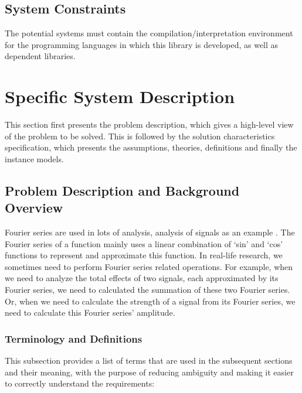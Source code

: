 \documentclass[12pt]{article}
\begin{document}
\subsection{System Constraints}

The potential systems must contain the compilation/interpretation environment 
for the programming languages in which this library is developed, as well 
as dependent libraries.

\section{Specific System Description}

This section first presents the problem description, which gives a high-level
view of the problem to be solved.  This is followed by the solution characteristics
specification, which presents the assumptions, theories, definitions and finally
the instance models.

\subsection{Problem Description and Background Overview} \label{Sbsc:CA-Background}
Fourier series are used in lots of analysis, analysis of signals as an example 
\cite{papoulis1977signal}. The Fourier series of a function mainly uses 
a linear combination of `sin' and `cos' functions to represent and approximate 
this function. In real-life research, we sometimes need to perform Fourier 
series related operations. For example, when we need to analyze the total 
effects of two signals, each approximated by its Fourier series, 
we need to calculated the summation of these two Fourier series. 
Or, when we need to calculate the strength of a signal from its Fourier 
series, we need to calculate this Fourier series' amplitude.

\subsubsection{Terminology and  Definitions}

This subsection provides a list of terms that are used in the subsequent
sections and their meaning, with the purpose of reducing ambiguity and making it
easier to correctly understand the requirements:
\end{document}
